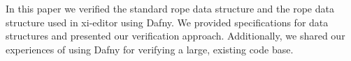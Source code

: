 In this paper we verified the standard rope data structure and the rope data structure used in xi-editor using Dafny.
We provided specifications for data structures and presented our verification approach.
Additionally, we shared our experiences of using Dafny for verifying a large, existing code base.